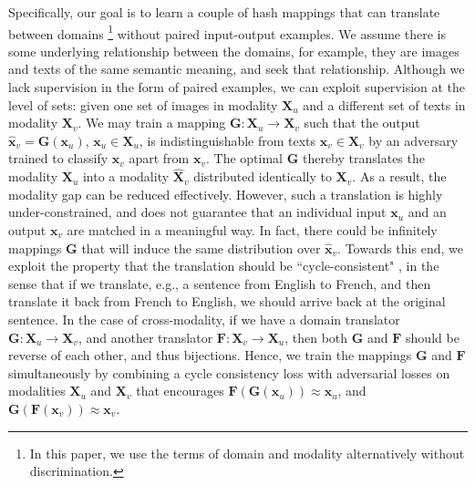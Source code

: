 \documentclass[10pt,journal,twocolumn]{IEEEtran}
\begin{document}
Specifically, our goal is to learn a couple of hash mappings that can translate between domains \footnote{In this paper, we use the terms of domain and modality alternatively without discrimination.} without paired input-output examples. We assume there is some underlying relationship between the domains, for example, they are images and texts of the same semantic meaning, and seek that relationship. Although we lack supervision in the form of paired examples, we can exploit supervision at the level of sets: given one set of images in modality $\boldsymbol X_u$ and a different set of texts in modality $\boldsymbol X_v$. We may train a mapping $\boldsymbol G: \boldsymbol X_u \rightarrow \boldsymbol X_v$ such that the output $\hat{\boldsymbol x}_v =\boldsymbol G(\boldsymbol x_u)$, $\boldsymbol x_u \in \boldsymbol X_u$, is indistinguishable from texts $\boldsymbol x_v \in \boldsymbol X_v$ by an adversary trained to classify $\hat{\boldsymbol x}_v$ apart from $\boldsymbol x_v$. The optimal $\boldsymbol G$ thereby translates the modality $\boldsymbol X_u$ into a modality $\hat{\boldsymbol X}_v$ distributed identically to $\boldsymbol X_v$. As a result, the modality gap can be reduced effectively. However, such a translation is highly under-constrained, and does not guarantee that an individual input $\boldsymbol x_u$ and an output $\boldsymbol x_v$ are matched in a meaningful way. In fact, there could be infinitely mappings $\boldsymbol G$ that will induce the same distribution over $\hat{\boldsymbol x}_v$. Towards this end, we exploit the property that the translation should be ``cycle-consistent" \cite{CycleGAN}, in the sense that if we translate, e.g., a sentence from English to French, and then translate it back from French to English, we should arrive back at the original sentence. In the case of cross-modality, if we have a domain translator $\boldsymbol G: \boldsymbol X_u \rightarrow \boldsymbol X_v$, and another translator $\boldsymbol F: \boldsymbol X_v \rightarrow \boldsymbol X_u$, then both $\boldsymbol G$ and $\boldsymbol F$ should be reverse of each other, and thus bijections. Hence, we train the mappings $\boldsymbol G$ and $\boldsymbol F$ simultaneously by combining a cycle consistency loss \cite{3D-cycle} with adversarial losses on modalities $\boldsymbol X_u$ and $\boldsymbol X_v$ that encourages $\boldsymbol F(\boldsymbol G (\boldsymbol x_u)) \approx \boldsymbol x_u$, and $\boldsymbol G(\boldsymbol F (\boldsymbol x_v)) \approx \boldsymbol x_v$.
\end{document}
